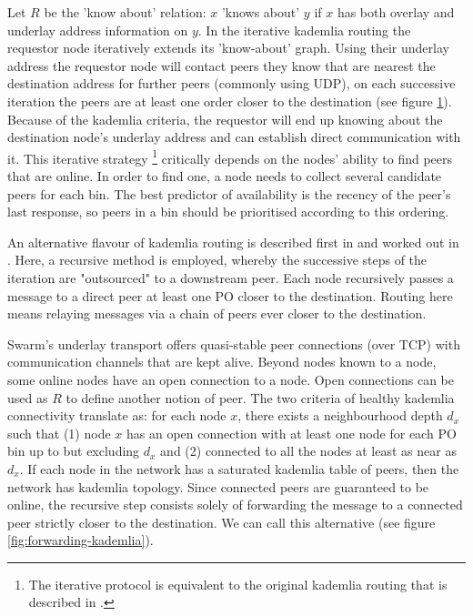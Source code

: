Let $R$ be the 'know about' relation:  $x$ 'knows about' $y$ if $x$ has both overlay and underlay address information on $y$. 
In the iterative kademlia routing the requestor node iteratively extends its 'know-about' graph. Using their underlay address the requestor node will contact peers they know that are nearest the destination address for further peers (commonly using UDP), on each successive iteration the peers are at least one order closer to the destination (see figure \ref{fig:iterative-kademlia}). Because of the kademlia criteria, the requestor will end up knowing about the destination node's underlay address and can establish direct communication with it. This iterative strategy%
%
\footnote{The iterative protocol is equivalent to   the original kademlia routing that is described in \cite{maymounkov2002kademlia}.
}
%
critically depends on the nodes' ability to find peers that are online. In order to find one, a node needs to collect several candidate peers for each bin. The best predictor of availability is the recency of the peer's last response, so peers in a bin should be prioritised according to this ordering.

\begin{figure}[htbp]
   \centering
   \caption{}
   \label{fig:iterative-kademlia}
\end{figure}


An alternative flavour of kademlia routing is described first in \cite{heep2010r} and worked out in \cite{tronetal2019-network}. Here, a recursive method is employed, whereby the successive steps of the iteration are "outsourced" to a downstream peer.
Each node recursively passes a message to a direct peer at least one PO closer to the destination. Routing here means relaying messages via a chain of peers ever closer to the destination.

Swarm's underlay transport offers quasi-stable peer connections (over TCP) with communication channels that are kept alive. Beyond nodes known to a node, some online nodes have an open connection to a node. Open connections can be used as $R$ to define another notion of peer. The two criteria of healthy kademlia connectivity translate as: for each node $x$, there exists a neighbourhood depth $d_x$ such that (1) node $x$ has an open connection with at least one node for each PO bin up to but excluding $d_x$ and (2) connected to all the nodes at least as near as $d_x$. If each node in the network has a saturated kademlia table of peers, then the network has kademlia topology. Since connected peers are guaranteed to be online, the recursive step consists solely of forwarding the message to a connected peer strictly closer to the destination. We can call this alternative  (see figure \ref{fig:forwarding-kademlia}). 


